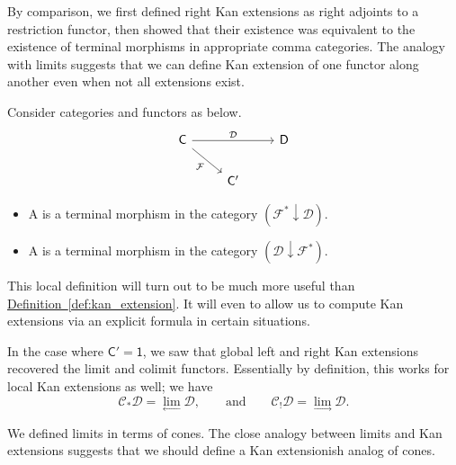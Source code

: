 \documentclass[main.tex]{subfiles}
\begin{document}
By comparison, we first defined right Kan extensions as right adjoints to a restriction functor, then showed that their existence was equivalent to the existence of terminal morphisms in appropriate comma categories. The analogy with limits suggests that we can define Kan extension of one functor along another even when not all extensions exist.

\begin{definition}
  \label{def:local_kan_extension}
  Consider categories and functors as below.
  \begin{equation*}
    \begin{tikzcd}
      \mathsf{C}
      \arrow[dr, swap, "\mathcal{F}"]
      \arrow[rr, "\mathcal{D}"]
      && \mathsf{D}
      \\
      & \mathsf{C'}
    \end{tikzcd}
  \end{equation*}
  \begin{itemize}
    \item A  is a terminal morphism in the category $(\mathcal{F}^{*} \downarrow \mathcal{D})$.

    \item A  is a terminal morphism in the category $(\mathcal{D}\downarrow \mathcal{F}^{*})$.
  \end{itemize}
\end{definition}

This local definition will turn out to be much more useful than \hyperref[def:kan_extension]{Definition~\ref*{def:kan_extension}}. It will even to allow us to compute Kan extensions via an explicit formula in certain situations.

\begin{example}
  In the case where $\mathsf{C}' = \mathsf{1}$, we saw that global left and right Kan extensions recovered the limit and colimit functors. Essentially by definition, this works for local Kan extensions as well; we have
  \begin{equation*}
    \mathcal{C}_{*}\mathcal{D} = \lim_{\leftarrow} \mathcal{D},\qquad \text{and}\qquad \mathcal{C}_{!}\mathcal{D} = \lim_{\rightarrow} \mathcal{D}.
  \end{equation*}
\end{example}

We defined limits in terms of cones. The close analogy between limits and Kan extensions suggests that we should define a Kan extensionish analog of cones.
\end{document}
